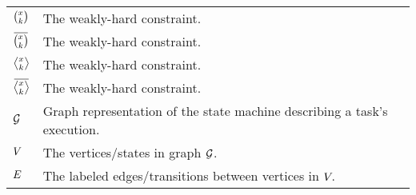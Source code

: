 \begin{table*}[h]
\begin{tabular}{l|l}
        $\binom{x_{}}{k_{}}$ & The \tAH{} weakly-hard constraint. \\
        $\anymiss{}$ & The \tAM{} weakly-hard constraint. \\
        $\rowhit{}$ & The \tRH{} weakly-hard constraint. \\
        $\rowmiss{}$ & The \tRM{} weakly-hard constraint. \\
        $\mathcal{G}_{}$ & Graph representation of the state machine describing a task's execution. \\
        $V_{}$ & The vertices/states in graph $\mathcal{G}_{}$. \\
        $E_{}$ & The labeled edges/transitions between vertices in $V_{}$. \\
    \end{tabular}
\end{table*}

